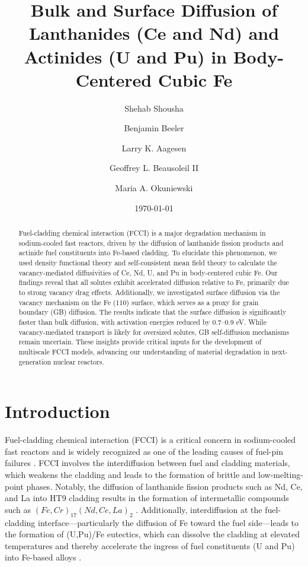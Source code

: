 \documentclass[preprint,12pt]{elsarticle}
\title{Bulk and Surface Diffusion of Lanthanides (Ce and  Nd) and Actinides (U and Pu) in Body-Centered Cubic Fe}
\author[inst1]{Shehab Shousha}
\affiliation[inst1]{organization={North Carolina State University},%
            city={Raleigh},
            state={NC},
            postcode={27695}, 
            country={United States}}
\author[inst1,inst2]{Benjamin Beeler}
\affiliation[inst2]{organization={Idaho National Laboratory},%
            city={Idaho Falls},
            state={ID},
            postcode={83415}, 
            country={United States}}
\author[inst2,inst3]{Larry K. Aagesen}
\affiliation[inst3]{organization={Department of Nuclear Engineering and Radiological Sciences, University of Michigan},%
            city={Ann Arbor},
            state={MI},
            postcode={48109}, 
            country={United States}}
\author[inst2]{Geoffrey L. Beausoleil II}
\author[inst4]{Maria A. Okuniewski}
\affiliation[inst4]{organization={Purdue University},%
            city={West Lafayette},
            state={IN},
            postcode={47907}, 
            country={United States}}
\date{\today}
\begin{document}
\begin{abstract}
Fuel-cladding chemical interaction (FCCI) is a major degradation mechanism in sodium-cooled fast reactors, driven by the diffusion of lanthanide fission products and actinide fuel constituents into Fe-based cladding.  To elucidate this phenomenon, we used density functional theory and self-consistent mean field theory to calculate the vacancy-mediated diffusivities of Ce, Nd, U, and Pu in body-centered cubic Fe. Our findings reveal that all solutes exhibit accelerated diffusion relative to Fe, primarily due to strong vacancy drag effects. Additionally, we investigated surface diffusion via the vacancy mechanism on the Fe (110) surface, which serves as a proxy for grain boundary (GB) diffusion. The results indicate that the surface diffusion is significantly faster than bulk diffusion, with activation energies reduced by 0.7–0.9 eV. While vacancy-mediated transport is likely for oversized solutes, GB self-diffusion mechanisms remain uncertain. These insights provide critical inputs for the development of multiscale FCCI models, advancing our understanding of material degradation in next-generation nuclear reactors. 
\end{abstract}

\maketitle

\section{Introduction}

\noindent Fuel-cladding chemical interaction (FCCI) is a critical concern in sodium-cooled fast reactors \cite{hofman_metallic_1997, pahl_experimental_1990, thomas_nano-mechanical_2021} and is widely recognized as one of the leading causes of fuel-pin failures \cite{matthews_fuel-cladding_2017}. FCCI involves the interdiffusion between fuel and cladding materials, which weakens the cladding and leads to the formation of brittle and low-melting-point phases. Notably, the diffusion of lanthanide fission products such as Nd, Ce, and La into HT9 cladding results in the formation of intermetallic compounds such as $(Fe, Cr)_{17}(Nd, Ce, La)_{2}$ \cite{keiser_fuel-cladding_2006, harp_scanning_2017}. Additionally, interdiffusion at the fuel-cladding interface—particularly the diffusion of Fe toward the fuel side—leads to the formation of (U,Pu)/Fe eutectics, which can dissolve the cladding at elevated temperatures and thereby accelerate the ingress of fuel constituents (U and Pu) into Fe-based alloys \cite{matthews_fuel-cladding_2017, keiser2009development, cohen1993fuel}.
\end{document}
